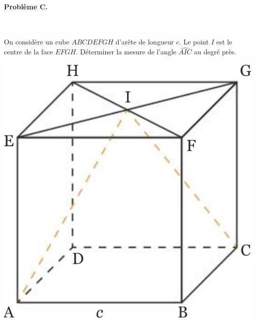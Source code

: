\documentclass[11pt]{article}
\begin{document}
\paragraph{Problème C.}~\\
\begin{minipage}[]{.6\textwidth}
  On considère un cube $ABCDEFGH$ d'arête de longueur $c$. Le point $I$ est le
  centre de la face $EFGH$. Déterminer la mesure de l'angle $\widehat{AIC}$ au
  degré près.
\end{minipage}
\begin{minipage}[]{.4\textwidth}
  \begin{center}
    \includegraphics[scale=.2]{pb3.png}
  \end{center}
\end{minipage}
\end{document}
